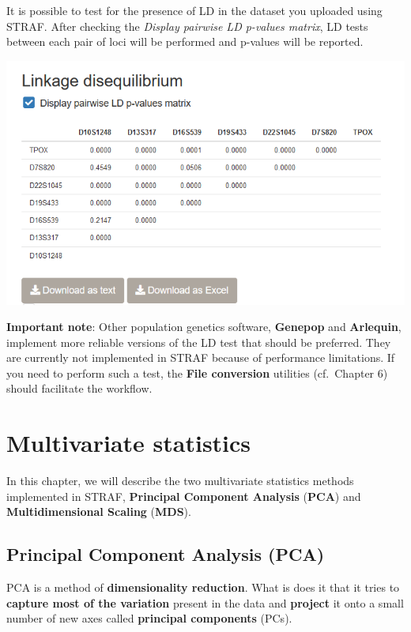 \documentclass[
]{book}
\begin{document}
It is possible to test for the presence of LD in the dataset you uploaded using
STRAF. After checking the \emph{Display pairwise LD p-values matrix}, LD tests between
each pair of loci will be performed and p-values will be reported.

\includegraphics[width=1\linewidth]{img/capture_popgen_parameters_2}

\textbf{Important note}: Other population genetics software,
\textbf{Genepop} and \textbf{Arlequin}, implement more reliable
versions of the LD test that should be preferred. They are currently not implemented
in STRAF because of performance limitations. If you need to perform such a test, the
\textbf{File conversion} utilities (cf.~Chapter 6) should facilitate the workflow.

\hypertarget{pca-mds}{%
\chapter{Multivariate statistics}\label{pca-mds}}

In this chapter, we will describe the two multivariate statistics methods implemented
in STRAF, \textbf{Principal Component Analysis} (\textbf{PCA}) and \textbf{Multidimensional Scaling} (\textbf{MDS}).

\hypertarget{principal-component-analysis-pca}{%
\section{Principal Component Analysis (PCA)}\label{principal-component-analysis-pca}}

PCA is a method of \textbf{dimensionality reduction}. What is does it that it tries to
\textbf{capture most of the variation} present in the data and \textbf{project} it onto a
small number of new axes called \textbf{principal components} (PCs).
\end{document}
